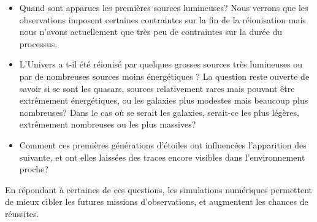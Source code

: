 \begin{itemize}
\item Quand sont apparues les premières sources lumineuses?
Nous verrons que les observations imposent certaines contraintes sur la fin de la réionisation mais nous n'avons actuellement que  très peu de contraintes sur la durée du processus.

\item L'Univers a t-il été réionisé par quelques grosses sources très lumineuses ou par de nombreuses sources moins énergétiques ?
La question reste ouverte de savoir si se sont les quasars, sources relativement rares mais pouvant être extrêmement énergétiques, ou les galaxies plus modestes mais beaucoup plus nombreuses?
Dans le cas où se serait les galaxies, serait-ce les plus légères, extrêmement nombreuses ou les plus massives?

\item Comment ces premières générations d'étoiles ont influencées l'apparition des suivante, et ont elles laissées des traces encore visibles dans l'environnement proche?

\end{itemize} 

En répondant à certaines de ces questions, les simulations numériques permettent de mieux cibler les futures missions d'observations, et augmentent les chances de réussites.



